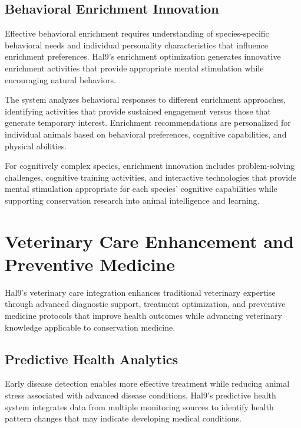 \documentclass[
  Letterpaper,
]{scrbook}
\begin{document}
\subsection{Behavioral Enrichment
Innovation}\label{behavioral-enrichment-innovation}

Effective behavioral enrichment requires understanding of
species-specific behavioral needs and individual personality
characteristics that influence enrichment preferences. Hal9's enrichment
optimization generates innovative enrichment activities that provide
appropriate mental stimulation while encouraging natural behaviors.

The system analyzes behavioral responses to different enrichment
approaches, identifying activities that provide sustained engagement
versus those that generate temporary interest. Enrichment
recommendations are personalized for individual animals based on
behavioral preferences, cognitive capabilities, and physical abilities.

For cognitively complex species, enrichment innovation includes
problem-solving challenges, cognitive training activities, and
interactive technologies that provide mental stimulation appropriate for
each species' cognitive capabilities while supporting conservation
research into animal intelligence and learning.

\section{Veterinary Care Enhancement and Preventive
Medicine}\label{veterinary-care-enhancement-and-preventive-medicine}

Hal9's veterinary care integration enhances traditional veterinary
expertise through advanced diagnostic support, treatment optimization,
and preventive medicine protocols that improve health outcomes while
advancing veterinary knowledge applicable to conservation medicine.

\subsection{Predictive Health
Analytics}\label{predictive-health-analytics}

Early disease detection enables more effective treatment while reducing
animal stress associated with advanced disease conditions. Hal9's
predictive health system integrates data from multiple monitoring
sources to identify health pattern changes that may indicate developing
medical conditions.
\end{document}
